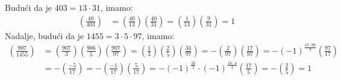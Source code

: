 \documentclass{exam}
\begin{document}
\begin{questions}
\begin{solution}
  Budući da je $403 = 13 \cdot 31$, imamo:
  \begin{align*}
    \left( \frac{40}{403} \right) &= \left( \frac{40}{13} \right) \left( \frac{40}{31} \right) = \left( \frac{1}{13} \right) \left( \frac{9}{31} \right) = 1
  \end{align*}
  Nadalje, budući da je $1455 = 3 \cdot 5 \cdot 97$, imamo:
  \begin{align*}
    \left( \frac{907}{1455} \right) &= \left( \frac{907}{3} \right) \left( \frac{906}{5} \right) \left( \frac{907}{97} \right) = \left( \frac{1}{3} \right) \left( \frac{2}{5} \right) \left( \frac{34}{97} \right) = -\left( \frac{2}{97} \right) \left( \frac{17}{97} \right) = - (-1)^{\frac{16 \cdot 96}{4}} \left( \frac{97}{17} \right)\\
    &= -\left( \frac{-5}{17} \right) = -\left( \frac{-1}{17} \right) \left( \frac{5}{17} \right) = - (-1)^{\frac{16}{2}} \cdot (-1)^{\frac{16 \cdot 4}{4}} \left( \frac{17}{5} \right) = - \left( \frac{2}{5} \right) = 1
  \end{align*}
\end{solution}

\pagebreak

\question
{}

\begin{solution}
  \begin{parts}

\end{parts}
\end{solution}
\end{questions}
\end{document}

